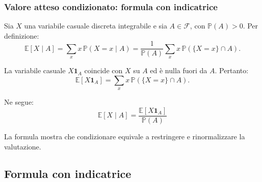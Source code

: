 \documentclass[handout]{beamer}%
\providecommand{\E}{\mathbb{E}}
\providecommand{\Prob}{\mathbb{P}}
\providecommand{\F}{\mathcal{F}}
\providecommand{\1}{\mathbf{1}}
\providecommand{\QTR}[2]{\csname #1\endcsname{#2}}
\begin{document}
\begin{frame}%
%

\frametitle{Valore atteso condizionato: formula con indicatrice}%
%

%


Sia $X$ una variabile casuale discreta integrabile e sia $A\in\F$, con
$\Prob(A)>0$. Per definizione:
\[
\E[X\mid A] =\sum_{x} x\,\Prob(X=x\mid A) =\frac{1}{\Prob(A)}  \sum_{x}
x\,\Prob(\{X=x\}\cap A).
\]


\medskip

La variabile casuale $X\1_{A}$ coincide con $X$ su $A$ ed \`{e} nulla fuori da
$A$. Pertanto:
\[
\E[X\1_A] =\sum_{x} x\,\Prob(\{X=x\}\cap A).
\]


Ne segue:
\[
\boxed{
\E[X\mid A]
=\frac{\E[X\1_A]}{\Prob(A)}
}
\]


\begin{center}
{\small La formula mostra che condizionare equivale a restringere e
rinormalizzare la valutazione.}
\end{center}%

\transboxout
\end{frame}%


\subsection{Formula con indicatrice}%
\end{document}

